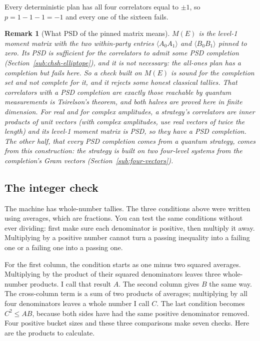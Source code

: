 \documentclass[11pt,twoside]{article}
\theoremstyle{thielethm}
\theoremstyle{thieledef}
\theoremstyle{thieledef}
\newtheorem{remark}{Remark}[section]
\theoremstyle{thieledef}
\theoremstyle{thielethm}
\theoremstyle{thieleobs}
\theoremstyle{thielethm}
\begin{document}
Every deterministic plan has all four correlators equal to $\pm 1$, so $p = 1 - 1 - 1 = -1$
and every one of the sixteen fails.

\begin{remark}[What PSD of the pinned matrix means]\label{rem:chsh-scope-five}
$M(E)$ is the level-1 moment matrix with the two within-party entries $\langle A_0 A_1
\rangle$ and $\langle B_0 B_1 \rangle$ pinned to zero. Its PSD is sufficient for the
correlators to admit some PSD completion (Section~\ref{sub:chsh-elliptope}), and it
is not necessary: the all-ones plan has a completion but fails here. So a check built on
$M(E)$ is sound for the completion set and not complete for it, and it rejects some honest
classical tallies. That correlators with a PSD completion are exactly those reachable by
quantum measurements is Tsirelson's theorem, and both halves are proved here in finite dimension.
For real and for complex amplitudes, a strategy's correlators are inner products of unit vectors
(with complex amplitudes, use real vectors of twice the length) and its level-1 moment matrix is PSD, so they have a PSD completion. The other half, that every PSD completion comes from a quantum
strategy, comes from this construction: the strategy is built on two four-level systems from
the completion's Gram vectors (Section~\ref{sub:four-vectors}).
\end{remark}

\subsection{The integer check}


The machine has whole-number tallies. The three conditions above were written
using averages, which are fractions. You can test the same conditions without
ever dividing: first make sure each denominator is positive, then multiply
it away. Multiplying by a positive number cannot turn a passing inequality
into a failing one or a failing one into a passing one.

For the first column, the condition starts as one minus two squared averages.
Multiplying by the product of their squared denominators leaves three
whole-number products. I call that result $A$. The second column gives $B$
the same way. The cross-column term is a sum of two products of averages;
multiplying by all four denominators leaves a whole number I call $C$.
The last condition becomes $C^2\le AB$, because both sides have had the same
positive denominator removed. Four positive bucket sizes and these three
comparisons make seven checks. Here are the products to calculate.
\end{document}
